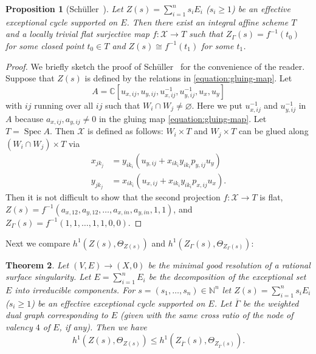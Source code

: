 \documentclass[a4paper, reqno, twoside]{amsart}
\newtheorem{theorem}{Theorem}[section]
\newtheorem{proposition}[theorem]{Proposition}
\theoremstyle{definition}
\numberwithin{equation}{section}
\begin{document}
\begin{proposition}[{Sch\"uller~\cite[Proposition~3.14]{Schuller-2012}}]
\label{proposition:deformation-Z-C}
Let $Z(s)=\sum_{i=1}^{n} s_i E_i$ ($s_i \ge 1$) be an effective exceptional
cycle supported on $E$. Then there exist an integral affine scheme $T$ and a locally trivial flat surjective map $f\colon
\mathcal{X} \to T$ such that $Z_{\Gamma}(s)=f^{-1}(t_0)$ for some closed point $t_0 \in T$ and $Z(s) \cong f^{-1}(t_1)$ for some $t_1$.
\end{proposition}

\begin{proof}
We briefly sketch the proof of
Sch\"uller~\cite[Proposition~3.14]{Schuller-2012} for the convenience
of the reader. Suppose that $Z(s)$ is defined by the relations in
\eqref{equation:gluing-map}. Let
\begin{equation}\label{equation:A}
A = \mathbb{C}[u_{x,ij}, u_{y,ij}, u_{x,ij}^{-1}, u_{y,ij}^{-1}, u_x, u_y]
\end{equation}
with $ij$ running over all $ij$ such that $W_i \cap W_j \neq
\varnothing$. Here we put $u_{x,ij}^{-1}$ and $u_{y,ij}^{-1}$ in $A$
because $a_{x,ij}, a_{y,ij} \neq 0$ in the gluing map
\eqref{equation:gluing-map}. Let $T=\operatorname{Spec}{A}$. Then $\mathcal{X}$ is
defined as follows: $W_i \times T$ and $W_j \times T$ can be glued
along $(W_i \cap W_j) \times T$ via
\begin{align*}
x_{jk_j} &= y_{ik_i}(u_{y,ij} + x_{ik_i}y_{ik_i}p_{y,ij}u_y) \\
y_{jk_j} &= x_{ik_i}(u_{x,ij} + x_{ik_i}y_{ik_i}p_{x,ij}u_x).
\end{align*}
Then it is not difficult to show that the second projection $f\colon
\mathcal{X} \to T$ is flat, $Z(s) =
f^{-1}(a_{x,12},a_{y,12},\dotsc,a_{x,in},a_{y,in}, 1,1)$, and $Z_{\Gamma}(s) = f^{-1}(1,1,\dotsc,1,1,0,0)$.
\end{proof}

Next we compare $h^1(Z(s), \Theta_{Z(s)})$ and $h^1(Z_{\Gamma}(s),
\Theta_{Z_{\Gamma}(s)})$:

\begin{theorem}\label{theorem:maximality}
Let $(V, E) \to (X, 0)$ be the minimal good resolution of a rational
surface singularity. Let $E = \sum_{i=1}^{n} E_i$ be the decomposition
of the exceptional set $E$ into irreducible components. For $s=(s_1,
\dotsc, s_n) \in \mathbb{N}^n$ let $Z(s)=\sum_{i=1}^{n} s_i E_i$ ($s_i
\ge 1$) be an effective exceptional cycle supported on $E$.  Let
$\overline{\Gamma}$ be the weighted dual graph corresponding to $E$
(given with the same cross ratio of the node of valency $4$ of $E$, if
any). Then we have
\[
h^1(Z(s), \Theta_{Z(s)}) \le h^1(Z_{\overline{\Gamma}}(s),
\Theta_{Z_{\overline{\Gamma}}(s)}).\]
\end{theorem}
\end{document}
